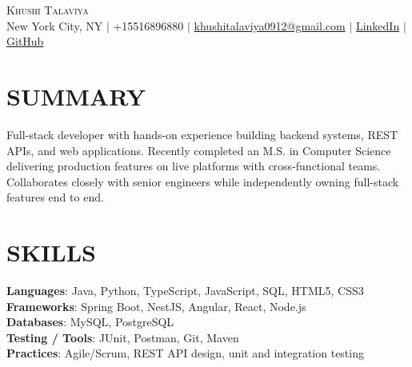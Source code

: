 \documentclass[letterpaper,11pt]{article}
\begin{document}
\begin{center}
    {\Huge \scshape Khushi Talaviya} \\ \vspace{2pt}
    \vspace{4pt}
    \small
    New York City, NY $|$
    \small
    +15516896880 $|$
    \href{mailto:khushitalaviya0912@gmail.com}{khushitalaviya0912@gmail.com} $|$
    \href{https://www.linkedin.com/in/khushitalaviya/}{LinkedIn} $|$
    \href{https://github.com/talaviyakhushi}{GitHub}
\end{center}

\section{SUMMARY}
\vspace{5pt}
\small{Full-stack developer with hands-on experience building backend systems, REST APIs, and web applications. Recently completed an M.S. in Computer Science delivering production features on live platforms with cross-functional teams. Collaborates closely with senior engineers while independently owning full-stack features end to end.}

\vspace{2pt}
\section{SKILLS}
\vspace{5pt}
\begin{itemize}[leftmargin=0in, label={}]
\small{\item{
\textbf{Languages}{: Java, Python, TypeScript, JavaScript, SQL, HTML5, CSS3} \\
\textbf{Frameworks}{: Spring Boot, NestJS, Angular, React, Node.js} \\
\textbf{Databases}{: MySQL, PostgreSQL} \\
\textbf{Testing / Tools}{: JUnit, Postman, Git, Maven} \\
\textbf{Practices}{: Agile/Scrum, REST API design, unit and integration testing}
}}
\end{itemize}
\vspace{-10pt}

\end{document}
